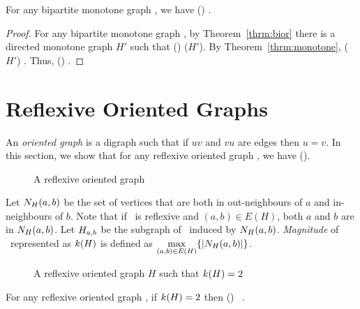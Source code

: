 \begin{theorem} 
For any bipartite monotone graph \mH, we have \chom(\mH) \maple \cbis\@.
\end{theorem}

\begin{proof}
For any bipartite monotone graph \mH, by Theorem~\ref{thrm:bior} there is a directed monotone 
graph \(H'\) such that \chom(\mH) \maple \chom(\(H'\))\@. By Theorem~\ref{thrm:monotone},
\chom(\(H'\)) \maple \cbis\@. Thus, \chom(\mH) \maple \cbis\@.
\end{proof}

\section{Reflexive Oriented Graphs}
An \emph{oriented graph} is a digraph such that if \(uv\) and \(vu\) are edges then \(u=v\)\@.
In this section, we show that for any reflexive oriented graph \mH, we have \cbis \maple \chom(\mH)\@.

\begin{figure}[h]
\center{}
\caption{A reflexive oriented graph}
\end{figure}

Let \(N_{H}({a},{b})\) be the set of vertices that are both in
out-neighbours of \(a\) and in-neighbours of \(b\).
Note that if \mH\ is reflexive and \((a,b)\in E(H)\),
both \(a\) and \(b\) are in \(N_{H}({a},{b})\)\@.
Let \(H_{a,b}\) be the subgraph of \mH\ induced by \(N_{H}({a},{b})\).
\emph{Magnitude} of \mH\ represented as \(k(H)\) is defined as
\(\max \limits_{(a,b) \in E(H)} \{{|N_{H}({a},{b})|}\}\)\@.

\begin{figure}[h]
\center{}
\caption{A reflexive oriented graph \ensuremath{H} such that \ensuremath{\magf(H)=2}}
\end{figure}

\begin{lemma} \label{lem:triangle-free}
For any reflexive oriented graph \mH, if \(k(H)=2\) then \chom(\mH) \mapge\ \cbis\@.
\end{lemma}

